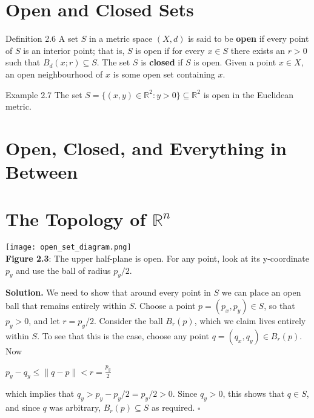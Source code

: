 \documentclass{article}
\theoremstyle{definition}
\numberwithin{equation}{section}
\begin{document}
\section{Open and Closed Sets}

\begin{mydefbox}{Definition 2.6}
A set $S$ in a metric space $(X, d)$ is said to be \textbf{open} if every point of $S$ is an interior point; that is, $S$ is open if for every $x \in S$ there exists an $r > 0$ such that $B_d(x; r) \subseteq S$. The set $S$ is \textbf{closed} if $S$ is open. Given a point $x \in X$, an open neighbourhood of $x$ is some open set containing $x$.
\end{mydefbox}

\begin{myexamplebox}{Example 2.7}
The set $S = \{(x, y) \in \mathbb{R}^2 : y > 0\} \subseteq \mathbb{R}^2$ is open in the Euclidean metric.
\end{myexamplebox}

\begin{center}
\section{Open, Closed, and Everything in Between}
\section{The Topology of $\mathbb{R}^n$}
\end{center}

\begin{center}
\texttt{[image: open\_set\_diagram.png]} \\
\textbf{Figure 2.3}: The upper half-plane is open. For any point, look at its y-coordinate $p_y$ and use the ball of radius $p_y /2$. 
\end{center}

\textbf{Solution.} We need to show that around every point in $S$ we can place an open ball that remains entirely within $S$. Choose a point $p = (p_x, p_y) \in S$, so that $p_y > 0$, and let $r = p_y / 2$. Consider the ball $B_r (p)$, which we claim lives entirely within $S$. To see that this is the case, choose any point $q = (q_x, q_y) \in B_r (p)$. Now

$ p_y - q_y \leq \|q - p\| < r = \frac{p_y}{2} $

which implies that $q_y > p_y - p_y / 2 = p_y / 2 > 0$. Since $q_y > 0$, this shows that $q \in S$, and since $q$ was arbitrary, $B_r (p) \subseteq S$ as required. \hspace*{\fill} $\square$
\end{document}
